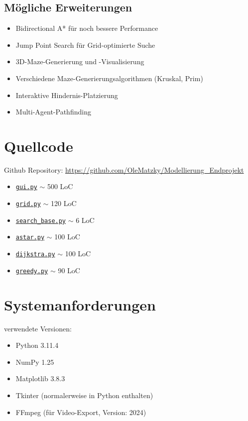 \documentclass[12pt,a4paper]{article}
\begin{document}
\subsection{Mögliche Erweiterungen}
\begin{itemize}
    \item Bidirectional A* für noch bessere Performance
    \item Jump Point Search für Grid-optimierte Suche
    \item 3D-Maze-Generierung und -Visualisierung
    \item Verschiedene Maze-Generierungsalgorithmen (Kruskal, Prim)
    \item Interaktive Hindernis-Platzierung
    \item Multi-Agent-Pathfinding
\end{itemize}

\newpage
\appendix

\section{Quellcode}
Github Repository: \url{https://github.com/OleMatzky/Modellierung_Endprojekt}
\begin{itemize}
    \item \href{https://github.com/OleMatzky/Modellierung_Endprojekt/blob/main/Code/gui.py}{\texttt{gui.py}} $\sim$ 500 LoC
    \item \href{https://github.com/OleMatzky/Modellierung_Endprojekt/blob/main/Code/source/grid.py}{\texttt{grid.py}} $\sim$ 120 LoC
    \item \href{https://github.com/OleMatzky/Modellierung_Endprojekt/blob/main/Code/source/search_base.py}{\texttt{search\_base.py}} $\sim$ 6 LoC
    \item \href{https://github.com/OleMatzky/Modellierung_Endprojekt/blob/main/Code/source/astar.py}{\texttt{astar.py}} $\sim$ 100 LoC
    \item \href{https://github.com/OleMatzky/Modellierung_Endprojekt/blob/main/Code/source/dijkstra.py}{\texttt{dijkstra.py}} $\sim$ 100 LoC
    \item \href{https://github.com/OleMatzky/Modellierung_Endprojekt/blob/main/Code/source/greedy.py}{\texttt{greedy.py}} $\sim$ 90 LoC
\end{itemize}

\section{Systemanforderungen}
verwendete Versionen:
\begin{itemize}
    \item Python 3.11.4
    \item NumPy 1.25
    \item Matplotlib 3.8.3
    \item Tkinter (normalerweise in Python enthalten)
    \item FFmpeg (für Video-Export, Version: 2024)
\end{itemize}
\end{document}
